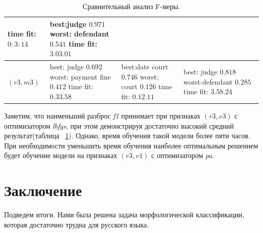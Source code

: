 \documentclass{csmathnotes}
\begin{document}
\begin{table}[!h]
\begin{center}
\begin{tabular}{|p{3.1cm}|p{2.5cm}|p{2.5cm}|p{2.5cm}|}
              time fit:\newline $0:3:14$
            & best:\newline  judge $0.971$\newline
              worst: \newline defendant  $0.541$\newline
              time fit:\newline $3.03.01$\\
            \hline
            $(r3, m3)$
            & best: \newline judge $0.692$ \newline
            worst: \newline payment fine $0.412$ \newline
            time fit: \newline  $0.33.58$
            & best:\newline   date court   $0.746$ \newline
             worst: \newline court $0.126$ \newline
             time fit: \newline $0.12.11$
            & best: \newline   judge $0.818$ \newline
              worst:\newline defendant $0.285$ \newline 
              time fit: \newline $3.58.24$\\
            \hline
        \end{tabular}
    \end{center}
    \caption{\label{tabl:table2}Сравнительный анализ F-меры.}
\end{table}

Заметим, что наименьший разброс \emph{f1}  принимает при признаках $(r3,v3)$ с оптимизатором \emph{lbfgs}, при этом демонстрируя достаточно высокий средний результат(таблица ~\ref{tabl:table2}). Однако, время обучения такой модели более пяти часов. При необходимости уменьшить время обучения наиболее оптимальным решением будет обучение модели на признаках $(r3,v1)$ с оптимизатором \emph{pa}.

\section*{Заключение}
Подведем итоги. Нами была решена задача морфологической классификации, которая достаточно трудна для русского языка. 
\end{document}
